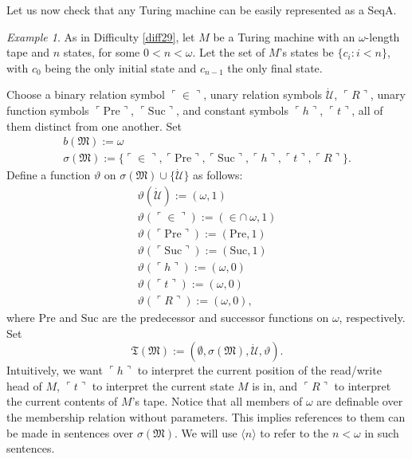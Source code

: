 \documentclass[12pt, twoside]{memoir}
\numberwithin{equation}{section}
\theoremstyle{definition}
\theoremstyle{remark}
\newtheorem{ex}[thm]{Example}
\theoremstyle{definition}
\theoremstyle{definition}
\theoremstyle{definition}
\theoremstyle{remark}
\begin{document}
Let us now check that any Turing machine can be easily represented as a SeqA.

\begin{ex}\label{ex212}
As in Difficulty \ref{diff29}, let $M$ be a Turing machine with an $\omega$-length tape and $n$ states, for some $0 < n < \omega$. Let the set of $M$'s states be $\{c_i : i < n\}$, with $c_0$ being the only initial state and $c_{n-1}$ the only final state. 

Choose a binary relation symbol $\ulcorner \in \urcorner$, unary relation symbols $\dot{\mathcal{U}}$, $\ulcorner R \urcorner$, unary function symbols $\ulcorner \mathrm{Pre} \urcorner$, $\ulcorner \mathrm{Suc} \urcorner$, and constant symbols $\ulcorner h \urcorner$, $\ulcorner t \urcorner$, all of them distinct from one another. Set 
\begin{gather*}
    b(\mathfrak{M}) := \omega \\
    \sigma(\mathfrak{M}) := \{\ulcorner \in \urcorner, \ulcorner \mathrm{Pre} \urcorner, \ulcorner \mathrm{Suc} \urcorner, \ulcorner h \urcorner, \ulcorner t \urcorner, \ulcorner R \urcorner\} \text{.}
\end{gather*}
Define a function $\vartheta$ on $\sigma(\mathfrak{M}) \cup \{\dot{\mathcal{U}}\}$ as follows:
\begin{gather*}
    \vartheta(\dot{\mathcal{U}}) := (\omega, 1) \\
    \vartheta(\ulcorner \in \urcorner) := (\in \cap \ \omega, 1) \\
    \vartheta(\ulcorner \mathrm{Pre} \urcorner) := (\mathrm{Pre}, 1) \\
    \vartheta(\ulcorner \mathrm{Suc} \urcorner) := (\mathrm{Suc}, 1) \\
    \vartheta(\ulcorner h \urcorner) := (\omega, 0) \\
    \vartheta(\ulcorner t \urcorner) := (\omega, 0) \\
    \vartheta(\ulcorner R \urcorner) := (\omega, 0) \text{,}
\end{gather*}
where $\mathrm{Pre}$ and $\mathrm{Suc}$ are the predecessor and successor functions on $\omega$, respectively. Set
\begin{equation*}
    \mathfrak{T}(\mathfrak{M}) := (\emptyset, \sigma(\mathfrak{M}), \dot{\mathcal{U}}, \vartheta) \text{.}
\end{equation*}
Intuitively, we want $\ulcorner h \urcorner$ to interpret the current position of the read/write head of $M$, $\ulcorner t \urcorner$ to interpret the current state $M$ is in, and $\ulcorner R \urcorner$ to interpret the current contents of $M$'s tape. Notice that all members of $\omega$ are definable over the membership  relation without parameters. This implies references to them can be made in sentences over $\sigma(\mathfrak{M})$. We will use $\langle n \rangle$ to refer to the $n < \omega$ in such sentences. 


\end{ex}
\end{document}
